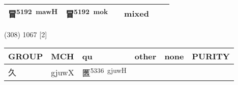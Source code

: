 \documentclass[14pt,a4paper]{scrartcl}
\begin{document}
\begin{longtable}[c]{@{}llllll@{}}
\begin{minipage}[t]{0.14\columnwidth}
冒\textsuperscript{5192~mawH}
\strut\end{minipage} &
\begin{minipage}[t]{0.14\columnwidth}\raggedright\strut
冒\textsuperscript{5192~mok}
\strut\end{minipage} &
\begin{minipage}[t]{0.14\columnwidth}\raggedright\strut
\strut\end{minipage} &
\begin{minipage}[t]{0.14\columnwidth}\raggedright\strut
mixed
\strut\end{minipage}\tabularnewline
\bottomrule
\end{longtable}

(308) 1067 {[}2{]}

\begin{longtable}[c]{@{}llllll@{}}
\toprule
\begin{minipage}[b]{0.14\columnwidth}\raggedright\strut
GROUP
\strut\end{minipage} &
\begin{minipage}[b]{0.14\columnwidth}\raggedright\strut
MCH
\strut\end{minipage} &
\begin{minipage}[b]{0.14\columnwidth}\raggedright\strut
qu
\strut\end{minipage} &
\begin{minipage}[b]{0.14\columnwidth}\raggedright\strut
other
\strut\end{minipage} &
\begin{minipage}[b]{0.14\columnwidth}\raggedright\strut
none
\strut\end{minipage} &
\begin{minipage}[b]{0.14\columnwidth}\raggedright\strut
PURITY
\strut\end{minipage}\tabularnewline
\midrule
\endhead
\begin{minipage}[t]{0.14\columnwidth}\raggedright\strut
久
\strut\end{minipage} &
\begin{minipage}[t]{0.14\columnwidth}\raggedright\strut
gjuwX
\strut\end{minipage} &
\begin{minipage}[t]{0.14\columnwidth}\raggedright\strut
匶\textsuperscript{5336~gjuwH}
\strut\end{minipage} &
\begin{minipage}[t]{0.14\columnwidth}\raggedright\strut
\strut\end{minipage} &
\begin{minipage}[t]{0.14\columnwidth}\raggedright\strut

\end{minipage}
\end{longtable}
\end{document}
